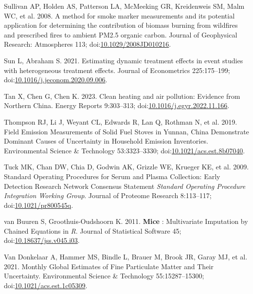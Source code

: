 \documentclass[
  letterpaper,
  DIV=11,
  numbers=noendperiod]{scrartcl}
\newlength{\cslhangindent}
\newenvironment{CSLReferences}[2] %
 {\begin{list}{}{%
  \setlength{\itemindent}{0pt}
  \setlength{\leftmargin}{0pt}
  \setlength{\parsep}{0pt}
  \ifodd #1
   \setlength{\leftmargin}{\cslhangindent}
   \setlength{\itemindent}{-1\cslhangindent}
  \fi
  \setlength{\itemsep}{#2\baselineskip}}}
 {\end{list}}
\begin{document}
\begin{CSLReferences}{1}{1}
Sullivan AP, Holden AS, Patterson LA, McMeeking GR, Kreidenweis SM, Malm
WC, et al. 2008. A method for smoke marker measurements and its
potential application for determining the contribution of biomass
burning from wildfires and prescribed fires to ambient {PM2}.5 organic
carbon. Journal of Geophysical Research: Atmospheres 113;
doi:\href{https://doi.org/10.1029/2008JD010216}{10.1029/2008JD010216}.

Sun L, Abraham S. 2021. Estimating dynamic treatment effects in event
studies with heterogeneous treatment effects. Journal of Econometrics
225:175--199;
doi:\href{https://doi.org/10.1016/j.jeconom.2020.09.006}{10.1016/j.jeconom.2020.09.006}.

Tan X, Chen G, Chen K. 2023. Clean heating and air pollution: {Evidence}
from {Northern China}. Energy Reports 9:303--313;
doi:\href{https://doi.org/10.1016/j.egyr.2022.11.166}{10.1016/j.egyr.2022.11.166}.

Thompson RJ, Li J, Weyant CL, Edwards R, Lan Q, Rothman N, et al. 2019.
Field {Emission Measurements} of {Solid Fuel Stoves} in {Yunnan}, {China
Demonstrate Dominant Causes} of {Uncertainty} in {Household Emission
Inventories}. Environmental Science \& Technology 53:3323--3330;
doi:\href{https://doi.org/10.1021/acs.est.8b07040}{10.1021/acs.est.8b07040}.

Tuck MK, Chan DW, Chia D, Godwin AK, Grizzle WE, Krueger KE, et al.
2009. Standard {Operating Procedures} for {Serum} and {Plasma
Collection}: {Early Detection Research Network Consensus Statement}
{\emph{Standard Operating Procedure Integration Working Group}}. Journal
of Proteome Research 8:113--117;
doi:\href{https://doi.org/10.1021/pr800545q}{10.1021/pr800545q}.

van Buuren S, Groothuis-Oudshoorn K. 2011. {\textbf{Mice}} :
{Multivariate Imputation} by {Chained Equations} in {\emph{R}}. Journal
of Statistical Software 45;
doi:\href{https://doi.org/10.18637/jss.v045.i03}{10.18637/jss.v045.i03}.

Van Donkelaar A, Hammer MS, Bindle L, Brauer M, Brook JR, Garay MJ, et
al. 2021. Monthly {Global Estimates} of {Fine Particulate Matter} and
{Their Uncertainty}. Environmental Science \& Technology
55:15287--15300;
doi:\href{https://doi.org/10.1021/acs.est.1c05309}{10.1021/acs.est.1c05309}.


\end{CSLReferences}
\end{document}
